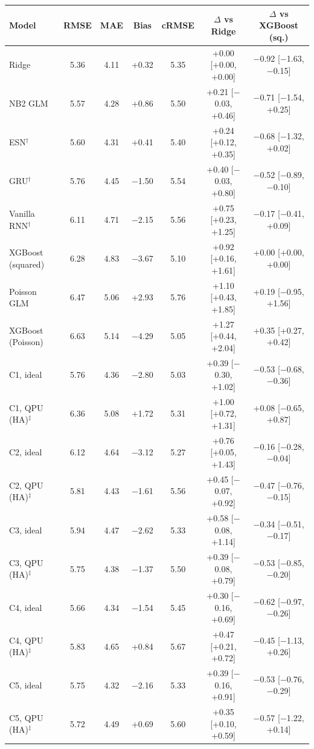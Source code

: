 \begin{tabular}{@{}lccccc c@{}}
\toprule
Model & RMSE & MAE & Bias & cRMSE & $\Delta$ vs Ridge & $\Delta$ vs XGBoost (sq.) \\
\midrule
Ridge & 5.36 & 4.11 & +0.32 & 5.35 & +0.00 [+0.00, +0.00] & $-$0.92 [$-$1.63, $-$0.15] \\
NB2 GLM & 5.57 & 4.28 & +0.86 & 5.50 & +0.21 [$-$0.03, +0.46] & $-$0.71 [$-$1.54, +0.25] \\
ESN$^\dagger$ & 5.60 & 4.31 & +0.41 & 5.40 & +0.24 [+0.12, +0.35] & $-$0.68 [$-$1.32, +0.02] \\
GRU$^\dagger$ & 5.76 & 4.45 & $-$1.50 & 5.54 & +0.40 [$-$0.03, +0.80] & $-$0.52 [$-$0.89, $-$0.10] \\
Vanilla RNN$^\dagger$ & 6.11 & 4.71 & $-$2.15 & 5.56 & +0.75 [+0.23, +1.25] & $-$0.17 [$-$0.41, +0.09] \\
XGBoost (squared) & 6.28 & 4.83 & $-$3.67 & 5.10 & +0.92 [+0.16, +1.61] & +0.00 [+0.00, +0.00] \\
Poisson GLM & 6.47 & 5.06 & +2.93 & 5.76 & +1.10 [+0.43, +1.85] & +0.19 [$-$0.95, +1.56] \\
XGBoost (Poisson) & 6.63 & 5.14 & $-$4.29 & 5.05 & +1.27 [+0.44, +2.04] & +0.35 [+0.27, +0.42] \\
\midrule
C1, ideal & 5.76 & 4.36 & $-$2.80 & 5.03 & +0.39 [$-$0.30, +1.02] & $-$0.53 [$-$0.68, $-$0.36] \\
C1, QPU (HA)$^\ddagger$ & 6.36 & 5.08 & +1.72 & 5.31 & +1.00 [+0.72, +1.31] & +0.08 [$-$0.65, +0.87] \\
C2, ideal & 6.12 & 4.64 & $-$3.12 & 5.27 & +0.76 [+0.05, +1.43] & $-$0.16 [$-$0.28, $-$0.04] \\
C2, QPU (HA)$^\ddagger$ & 5.81 & 4.43 & $-$1.61 & 5.56 & +0.45 [$-$0.07, +0.92] & $-$0.47 [$-$0.76, $-$0.15] \\
C3, ideal & 5.94 & 4.47 & $-$2.62 & 5.33 & +0.58 [$-$0.08, +1.14] & $-$0.34 [$-$0.51, $-$0.17] \\
C3, QPU (HA)$^\ddagger$ & 5.75 & 4.38 & $-$1.37 & 5.50 & +0.39 [$-$0.08, +0.79] & $-$0.53 [$-$0.85, $-$0.20] \\
C4, ideal & 5.66 & 4.34 & $-$1.54 & 5.45 & +0.30 [$-$0.16, +0.69] & $-$0.62 [$-$0.97, $-$0.26] \\
C4, QPU (HA)$^\ddagger$ & 5.83 & 4.65 & +0.84 & 5.67 & +0.47 [+0.21, +0.72] & $-$0.45 [$-$1.13, +0.26] \\
C5, ideal & 5.75 & 4.32 & $-$2.16 & 5.33 & +0.39 [$-$0.16, +0.91] & $-$0.53 [$-$0.76, $-$0.29] \\
C5, QPU (HA)$^\ddagger$ & 5.72 & 4.49 & +0.69 & 5.60 & +0.35 [+0.10, +0.59] & $-$0.57 [$-$1.22, +0.14] \\
\bottomrule
\end{tabular}
